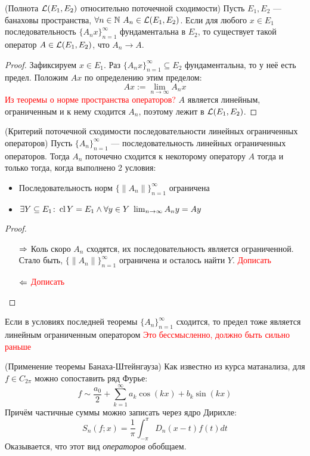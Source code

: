 \begin{theorem} (Полнота $\mathcal{L}(E_1, E_2)$ относительно поточечной сходимости)
	Пусть $E_1, E_2$ --- банаховы пространства, $\forall n \in \N\ A_n \in \cL(E_1, E_2)$. Если для любого $x \in E_1$ последовательность $\{A_nx\}_{n = 1}^\infty$ фундаментальна в $E_2$, то существует такой оператор $A \in \mathcal{L}(E_1, E_2)$, что $A_n \to A$.
\end{theorem}

\begin{proof}
	Зафиксируем $x \in E_1$. Раз $\{A_nx\}_{n = 1}^\infty \subseteq E_2$ фундаментальна, то у неё есть предел. Положим $Ax$ по определению этим пределом:
	\[
		Ax := \lim_{n \to \infty} A_nx
	\]
	\textcolor{red}{Из теоремы о норме пространства операторов?} $A$ является линейным, ограниченным и к нему сходится $A_n$, поэтому лежит в $\mathcal{L}(E_1, E_2)$.
\end{proof}

\begin{theorem} (Критерий поточечной сходимости последовательности линейных ограниченных операторов)
	Пусть $\{A_n\}_{n = 1}^\infty$ --- последовательность линейных ограниченных операторов. Тогда $A_n$ поточечно сходится к некоторому оператору $A$ тогда и только тогда, когда выполнено 2 условия:
	\begin{itemize}
		\item Последовательность норм $\{\|A_n\|\}_{n = 1}^\infty$ ограничена
		
		\item $\exists Y \subseteq E_1 \colon \operatorname{cl} Y = E_1 \wedge \forall y \in Y\ \lim_{n \to \infty} A_ny = Ay$
	\end{itemize}
\end{theorem}

\begin{proof}
	\begin{itemize}
		\item[$\Rightarrow$] Коль скоро $A_n$ сходятся, их последовательность является ограниченной. Стало быть, $\{\|A_n\|\}_{n = 1}^\infty$ ограничена и осталось найти $Y$. \textcolor{red}{Дописать}
		
		\item[$\Leftarrow$] \textcolor{red}{Дописать}
	\end{itemize}
\end{proof}

\begin{corollary}
	Если в условиях последней теоремы $\{A_n\}_{n = 1}^\infty$ сходится, то предел тоже является линейным ограниченным оператором \textcolor{red}{Это бессмысленно,  должно быть сильно раньше}
\end{corollary}

\begin{example} (Применение теоремы Банаха-Штейнгауза)
	Как известно из курса матанализа, для $f \in C_{2\pi}$ можно сопоставить ряд Фурье:
	\[
		f \sim \frac{a_0}{2} + \sum_{k = 1}^\infty a_k\cos(kx) + b_k\sin(kx)
	\]
	Причём частичные суммы можно записать через ядро Дирихле:
	\[
		S_n(f; x) = \frac{1}{\pi}\int_{-\pi}^\pi D_n(x - t)f(t)dt
	\]
	Оказывается, что этот вид \textit{операторов} обобщаем.
\end{example}